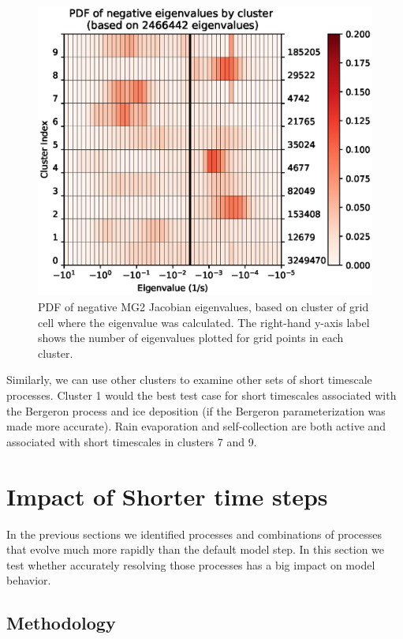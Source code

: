 \documentclass [11pt, proquest] {uwthesis}[2020/02/24]
\begin{document}
\begin{figure}[ht]
  \includegraphics[width=6.5in]{./time_hist_cluster_2D_neg.eps}
  \caption{PDF of negative MG2 Jacobian eigenvalues, based on cluster of grid cell where the eigenvalue was calculated. The right-hand y-axis label shows the number of eigenvalues plotted for grid points in each cluster.}
  \label{cluster-2D-neg-eig}
\end{figure}

Similarly, we can use other clusters to examine other sets of short timescale processes. Cluster 1 would the best test case for short timescales associated with the Bergeron process and ice deposition (if the Bergeron parameterization was made more accurate). Rain evaporation and self-collection are both active and associated with short timescales in clusters 7 and 9.

\section{Impact of Shorter time steps} \label{sec:impact}

In the previous sections we identified processes and combinations of processes that evolve much more rapidly than the default model step. In this section we test whether accurately resolving those processes has a big impact on model behavior.

\subsection{Methodology}
\end{document}
